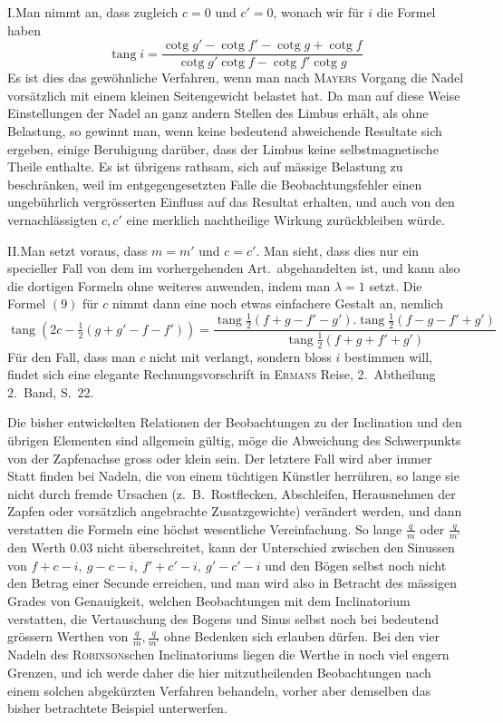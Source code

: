 I.\quad Man nimmt an, dass zugleich $c=0$ und $c'=0$, wonach wir für $i$ die Formel haben
\[
\operatorname{tang}i=\frac{\operatorname{cotg}g'-\operatorname{cotg}f'-\operatorname{cotg}g+\operatorname{cotg}f}{\operatorname{cotg}g'\operatorname{cotg}f-\operatorname{cotg}f'\operatorname{cotg}g}
\]
Es ist dies das gewöhnliche Verfahren, wenn man nach \textsc{Mayers} Vorgang die Nadel vorsätzlich mit einem kleinen Seitengewicht belastet hat. Da man auf diese Weise Einstellungen der Nadel an ganz andern Stellen des Limbus erhält, als ohne Belastung, so gewinnt man, wenn keine bedeutend abweichende Resultate sich ergeben, einige Beruhigung darüber, dass der Limbus keine selbstmagnetische Theile enthalte. Es ist übrigens rathsam, sich auf mässige Belastung zu beschränken, weil im entgegengesetzten Falle die Beobachtungsfehler einen ungebührlich vergrösserten Einfluss auf das Resultat erhalten, und auch von den vernachlässigten $c,c'$ eine merklich nachtheilige Wirkung zurückbleiben würde.

II.\quad Man setzt voraus, dass $m=m'$ und $c=c'$. Man sieht, dass dies nur ein specieller Fall von dem im vorhergehenden Art.\ abgehandelten ist, und kann also die dortigen Formeln ohne weiteres anwenden, indem man $\lambda=1$ setzt. Die Formel $(9)$ für $c$ nimmt dann eine noch etwas einfachere Gestalt an, nemlich
\[
\operatorname{tang}(2c-\tfrac12(g+g'-f-f'))=\frac{\operatorname{tang}\frac12(f+g-f'-g').\operatorname{tang}\frac12(f-g-f'+g')}{\operatorname{tang}\frac12(f+g+f'+g')}
\]
Für den Fall, dass man $c$ nicht mit verlangt, sondern bloss $i$ bestimmen will, findet sich eine elegante Rechnungsvorschrift in \textsc{Ermans} Reise, 2.\ Abtheilung 2.\ Band, S.\ 22.

Die bisher entwickelten Relationen der Beobachtungen zu der Inclination und den übrigen Elementen sind allgemein gültig, möge die Abweichung des Schwerpunkts von der Zapfenachse gross oder klein sein. Der letztere Fall wird aber immer Statt finden bei Nadeln, die von einem tüchtigen Künstler herrühren, so lange sie nicht durch fremde Ursachen (z.\ B.\ Rostflecken, Abschleifen, Herausnehmen der Zapfen oder vorsätzlich angebrachte Zusatzgewichte) verändert werden, und dann verstatten die Formeln eine höchst wesentliche Vereinfachung. So lange $\frac{q}{m}$ oder $\frac{q}{m'}$ den Werth $0.03$ nicht überschreitet, kann der Unterschied zwischen den Sinussen von $f+c-i,\ g-c-i,\ f'+c'-i,\ g'-c'-i$ und den Bögen selbst noch nicht den Betrag einer Secunde erreichen, und man wird also in Betracht des mässigen Grades von Genauigkeit, welchen Beobachtungen mit dem Inclinatorium verstatten, die Vertauschung des Bogens und Sinus selbst noch bei bedeutend grössern Werthen von $\frac{q}{m},\frac{q}{m'}$ ohne Bedenken sich erlauben dürfen. Bei den vier Nadeln des \textsc{Robinson}schen Inclinatoriums liegen die Werthe in noch viel engern Grenzen, und ich werde daher die hier mitzutheilenden Beobachtungen nach einem solchen abgekürzten Verfahren behandeln, vorher aber demselben das bisher betrachtete Beispiel unterwerfen.

